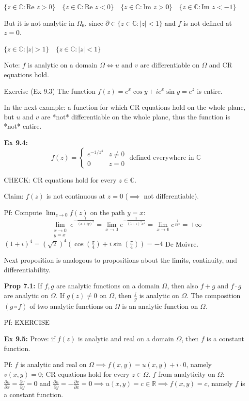 \documentclass{article}
\begin{document}
$\{z \in \mathbb{C}: \text{Re } z > 0\} \quad \{z \in \mathbb{C}: \text{Re } z < 0\} \quad \{z \in \mathbb{C}: \text{Im } z > 0\} \quad \{z \in \mathbb{C}: \text{Im } z < -1\}$

But it is not analytic in $\Omega_6$, since $\partial \in \{z \in \mathbb{C}: |z| < 1\}$ and $f$ is not defined at $z = 0$.

$\{z \in \mathbb{C}: |z| > 1\} \quad \{z \in \mathbb{C}: |z| < 1\}$

Note: $f$ is analytic on a domain $\Omega \iff u$ and $v$ are differentiable on $\Omega$ and CR equations hold.

Exercise (Ex 9.3) The function $f(z) = e^x \cos y + ie^x \sin y = e^z$ is entire.

In the next example: a function for which CR equations hold on the whole plane, but $u$ and $v$ are *not* differentiable on the whole plane, thus the function is *not* entire.

\textbf{Ex 9.4:}
$$ f(z) = \begin{cases}
e^{-1/z^4} & z \neq 0 \\
0 & z = 0
\end{cases}
\text{ defined everywhere in } \mathbb{C} $$

CHECK: CR equations hold for every $z \in \mathbb{C}$.

Claim: $f(z)$ is not continuous at $z = 0$ ($\implies$ not differentiable).

Pf: Compute $\lim_{z \to 0} f(z)$ on the path $y = x$:
$$ \lim_{\substack{x \to 0 \\ y = x}} e^{-\frac{1}{(x+iy)^4}} = \lim_{x \to 0} e^{-\frac{1}{(1+i)^4 x^4}} = \lim_{x \to 0} e^{\frac{1}{4x^4}} = +\infty $$
$(1 + i)^4 = (\sqrt{2})^4 (\cos(\frac{\pi}{4}) + i\sin(\frac{\pi}{4})) = -4$ De Moivre.

Next proposition is analogous to propositions about the limits, continuity, and differentiability.

\textbf{Prop 7.1:} If $f, g$ are analytic functions on a domain $\Omega$, then also $f + g$ and $f \cdot g$ are analytic on $\Omega$. If $g(z) \neq 0$ on $\Omega$, then $\frac{f}{g}$ is analytic on $\Omega$. The composition $(g \circ f)$ of two analytic functions on $\Omega$ is an analytic function on $\Omega$.

Pf: EXERCISE

\textbf{Ex 9.5:} Prove: if $f(z)$ is analytic and real on a domain $\Omega$, then $f$ is a constant function.

Pf: $f$ is analytic and real on $\Omega \implies f(x,y) = u(x,y) + i \cdot 0$, namely $v(x,y) = 0$; CR equations hold for every $z \in \Omega$.
$f$ from analyticity on $\Omega$: $\frac{\partial u}{\partial x} = \frac{\partial v}{\partial y} = 0$ and $\frac{\partial u}{\partial y} = -\frac{\partial v}{\partial x} = 0 \implies u(x,y) = c \in \mathbb{R} \implies f(x,y) = c$, namely $f$ is a constant function.
\end{document}

